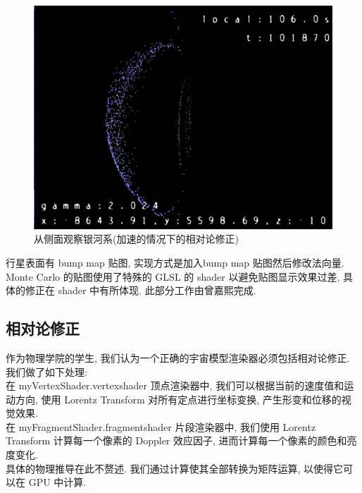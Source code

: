 \documentclass[a4paper,12pt,titlepage]{article}
\begin{document}
\begin{figure}[H]
\centering
	\includegraphics[scale=0.3]{02.png}
	\caption{从侧面观察银河系(加速的情况下的相对论修正)}
\end{figure}	

	行星表面有 bump map 贴图, 实现方式是加入bump map 贴图然后修改法向量. \\
	
	Monte Carlo 的贴图使用了特殊的 GLSL 的 shader 以避免贴图显示效果过差, 具体的修正在 shader 中有所体现. 此部分工作由曾嘉熙完成.
	
\subsection{相对论修正}

	作为物理学院的学生, 我们认为一个正确的宇宙模型渲染器必须包括相对论修正. 我们做了如下处理: \\
	
	在 myVertexShader.vertexshader 顶点渲染器中, 我们可以根据当前的速度值和运动方向, 使用 Lorentz Transform 对所有定点进行坐标变换, 产生形变和位移的视觉效果. \\
	
	在 myFragmentShader.fragmentshader 片段渲染器中, 我们使用 Lorentz Transform 计算每一个像素的 Doppler 效应因子, 进而计算每一个像素的颜色和亮度变化. \\
	
	具体的物理推导在此不赘述. 我们通过计算使其全部转换为矩阵运算, 以使得它可以在 GPU 中计算.
\end{document}
